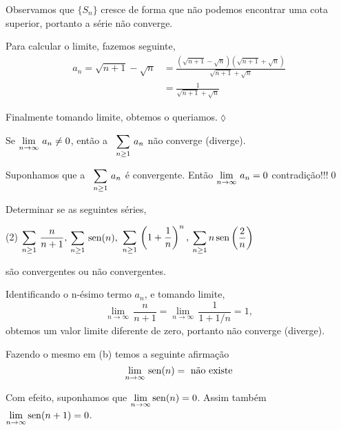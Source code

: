 Observamos que $\{S_n\}$ cresce de forma que n\~{a}o podemos encontrar
uma cota superior, portanto a s\'{e}rie n\~{a}o converge.

Para calcular o limite, fazemos seguinte,
\begin{align*}
    a_n=\sqrt{n+1}-\sqrt{n}&=\frac{(\sqrt{n+1}-\sqrt{n})(\sqrt{n+1}+\sqrt{n})}{\sqrt{n+1}+\sqrt{n}}\\[2ex]
     &=\frac{1}{\sqrt{n+1}+\sqrt{n}}
\end{align*}

Finalmente tomando limite, obtemos o queriamos.\hfill \(\lozenge\)

\begin{mdframed}
\begin{coro}
Se $\displaystyle{\lim_{n\to \infty}\,{a}_{n}}\neq 0$, ent\~{a}o a \ser\ $\displaystyle{\sum_{n\geq
1}\,a_n}$ n\~{a}o converge (diverge).
\end{coro}  
\end{mdframed}

\prova Suponhamos que a \ser\ $\displaystyle{\sum_{n\geq 1}\,a_n}$ \'{e}
convergente. Ent\~{a}o $\displaystyle{\lim_{n\to \infty}\,{a}_{n}}=0$ contradi\c{c}\~{a}o!!!\qed

\begin{exer}
Determinar se as seguintes s\'{e}ries,
\begin{tasks}[label=(\alph*),item-indent=6em,label-width=4ex,ref=(\alph*)](2)
\task \(\displaystyle\sum_{n\geq1}\,\frac{n}{n+1},\)
\task  \(\displaystyle \sum_{n\geq1}\,\operatorname{sen}(n),\)
\task  \(\displaystyle\sum_{n\geq1}\,\left(1+\frac{1}{n}\right)^n, \)
\task  \(\displaystyle \sum_{n\geq 1}n\operatorname{sen}\left(\frac{2}{n} \right)\)
\end{tasks}
s\~{a}o convergentes ou n\~{a}o convergentes.
\end{exer}

\solo Identificando o n-ésimo termo $a_n$, e tomando limite,
\begin{equation*}
  \lim_{n\to\infty}\,\frac{n}{n+1} =\lim_{n\to\infty}\,\frac{1}{1+1/n}=1,
\end{equation*}
obtemos um valor limite diferente de zero, portanto n\~{a}o converge (diverge).

Fazendo o mesmo em (b) temos a seguinte afirma\c{c}\~{a}o
\begin{equation*}
 \lim_{n\to\infty}\,\operatorname{sen}(n)   =\text{ n\~{a}o existe}
\end{equation*}

Com efeito, suponhamos que $\displaystyle{\lim_{n\to\infty}\operatorname{sen}(n)=0}$.
Assim tamb\'{e}m $\displaystyle{\lim_{n\to\infty}\operatorname{sen}(n+1)=0}$.

